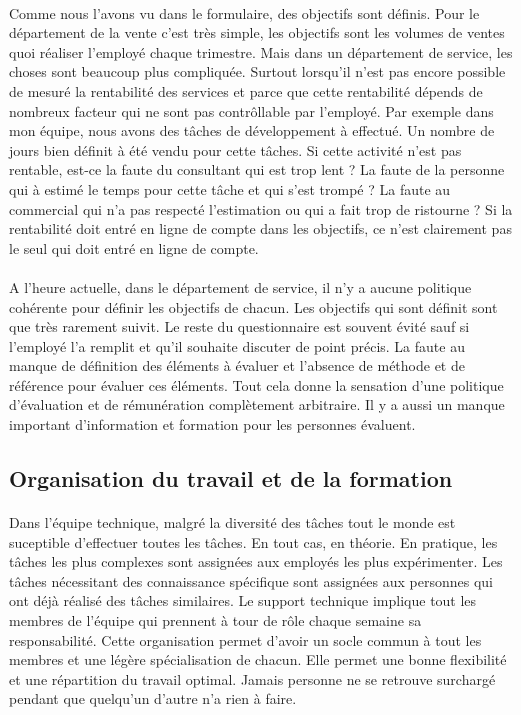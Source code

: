 \paragraph{}Comme nous l'avons vu dans le formulaire, des objectifs sont définis. Pour le département de la vente c'est très simple, les objectifs sont les volumes de ventes quoi réaliser l'employé chaque trimestre. Mais dans un département de service, les choses sont beaucoup plus compliquée. Surtout lorsqu'il n'est pas encore possible de mesuré la rentabilité des services et parce que cette rentabilité dépends de nombreux facteur qui ne sont pas contrôllable par l'employé. Par exemple dans mon équipe, nous avons des tâches de développement à effectué. Un nombre de jours bien définit à été vendu pour cette tâches. Si cette activité n'est pas rentable, est-ce la faute du consultant qui est trop lent ? La faute de la personne qui à estimé le temps pour cette tâche et qui s'est trompé ? La faute au commercial qui n'a pas respecté l'estimation ou qui a fait trop de ristourne ? Si la rentabilité doit entré en ligne de compte dans les objectifs, ce n'est clairement pas le seul qui doit entré en ligne de compte. 

\paragraph{}A l'heure actuelle, dans le département de service, il n'y a aucune politique cohérente pour définir les objectifs de chacun. Les objectifs qui sont définit sont que très rarement suivit. Le reste du questionnaire est souvent évité sauf si l'employé l'a remplit et qu'il souhaite discuter de point précis. La faute au manque de définition des éléments à évaluer et l'absence de méthode et de référence pour évaluer ces éléments. Tout cela donne la sensation d'une politique d'évaluation et de rémunération complètement arbitraire. Il y a aussi un manque important d'information et formation pour les personnes évaluent.



 


\subsection{Organisation du travail et de la formation}
\paragraph*{} Dans l'équipe technique, malgré la diversité des tâches tout le monde est suceptible d'effectuer toutes les tâches. En tout cas, en théorie. En pratique, les tâches les plus complexes sont assignées aux employés les plus expérimenter. Les tâches nécessitant des connaissance spécifique sont assignées aux personnes qui ont déjà réalisé des tâches similaires. Le support technique implique tout les membres de l'équipe qui prennent à tour de rôle chaque semaine sa responsabilité. Cette organisation permet d'avoir un socle commun à tout les membres et une légère spécialisation de chacun. Elle permet une bonne flexibilité et une répartition du travail optimal. Jamais personne ne se retrouve surchargé pendant que quelqu'un d'autre n'a rien à faire. 

